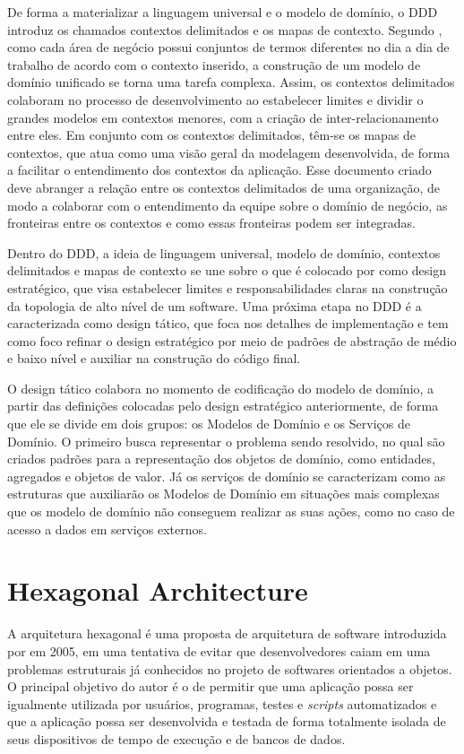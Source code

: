 \documentclass[12pt, %
openright, 
oneside, %
a4paper,    %
brazil]{facom-ufu-abntex2}
\begin{document}
De forma a materializar a linguagem universal e o modelo de domínio, o DDD introduz os chamados contextos delimitados e os mapas de contexto. Segundo , como cada área de negócio possui conjuntos de termos diferentes no dia a dia de trabalho de acordo com o contexto inserido, a construção de um modelo de domínio unificado se torna uma tarefa complexa. Assim, os contextos delimitados colaboram no processo de desenvolvimento ao estabelecer limites e dividir o grandes modelos em contextos menores, com a criação de inter-relacionamento entre eles. Em conjunto com os contextos delimitados, têm-se os mapas de contextos, que atua como uma visão geral da modelagem desenvolvida, de forma a facilitar o entendimento dos contextos da aplicação. Esse documento criado deve abranger a relação entre os contextos delimitados de uma organização, de modo a colaborar com o entendimento da equipe sobre o domínio de negócio, as fronteiras entre os contextos e como essas fronteiras podem ser integradas.

Dentro do DDD, a ideia de linguagem universal, modelo de domínio, contextos delimitados e mapas de contexto se une sobre o que é colocado por  como design estratégico, que visa estabelecer limites e responsabilidades claras na construção da topologia de alto nível de um software. Uma próxima etapa no DDD é a caracterizada como design tático, que foca nos detalhes de implementação e tem como foco refinar o design estratégico por meio de padrões de abstração de médio e baixo nível e auxiliar na construção do código final.

O design tático colabora no momento de codificação do modelo de domínio, a partir das definições colocadas pelo design estratégico anteriormente, de forma que ele se divide em dois grupos: os Modelos de Domínio e os Serviços de Domínio. O primeiro busca representar o problema sendo resolvido, no qual são criados padrões para a representação dos objetos de domínio, como entidades, agregados e objetos de valor. Já os serviços de domínio se caracterizam como as estruturas que auxiliarão os Modelos de Domínio em situações mais complexas que os modelo de domínio não conseguem realizar as suas ações, como no caso de acesso a dados em serviços externos.

\section{Hexagonal Architecture}
A arquitetura hexagonal é uma proposta de arquitetura de software introduzida por  em 2005, em uma tentativa de evitar que desenvolvedores caiam em uma problemas estruturais já conhecidos no projeto de softwares orientados a objetos. O principal objetivo do autor é o de permitir que uma aplicação possa ser igualmente utilizada por usuários, programas, testes e \textit{scripts} automatizados e que a aplicação possa ser desenvolvida e testada de forma totalmente isolada de seus dispositivos de tempo de execução e de bancos de dados.
\end{document}
